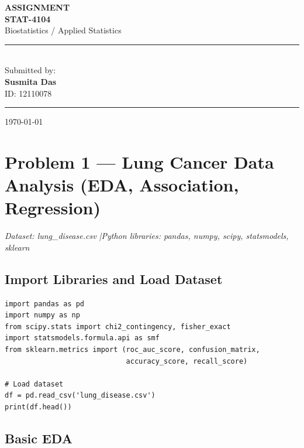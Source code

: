 \documentclass[12pt,a4paper]{article}
\begin{document}
\begin{titlepage}
  \centering
  \vspace*{3cm}
  {\fontsize{40}{48}\selectfont\colorbox{titleyellow}{\textcolor{titleblue}{\textbf{ASSIGNMENT}}}}\\[1.2cm]
  {\LARGE\textbf{STAT-4104}}\\[0.5cm]
  {\large Biostatistics / Applied Statistics}\\[2cm]
  \rule{0.6\textwidth}{0.5pt}\\[0.5cm]
  {\large Submitted by:}\\[0.3cm]
  {\Large\textbf{Susmita Das}}\\[0.2cm]
  {\large ID: 12110078}\\[0.5cm]
  \rule{0.6\textwidth}{0.5pt}
  \vfill
  {\small\today}
\end{titlepage}

\tableofcontents
\newpage

\section{Problem 1 — Lung Cancer Data Analysis (EDA, Association, Regression)}

\textit{Dataset: lung\_disease.csv \quad|\quad Python libraries: pandas, numpy, scipy, statsmodels, sklearn}

\subsection*{Import Libraries and Load Dataset}

\begin{lstlisting}
import pandas as pd
import numpy as np
from scipy.stats import chi2_contingency, fisher_exact
import statsmodels.formula.api as smf
from sklearn.metrics import (roc_auc_score, confusion_matrix,
                             accuracy_score, recall_score)

# Load dataset
df = pd.read_csv('lung_disease.csv')
print(df.head())
\end{lstlisting}

\subsection{Basic EDA}
\end{document}
